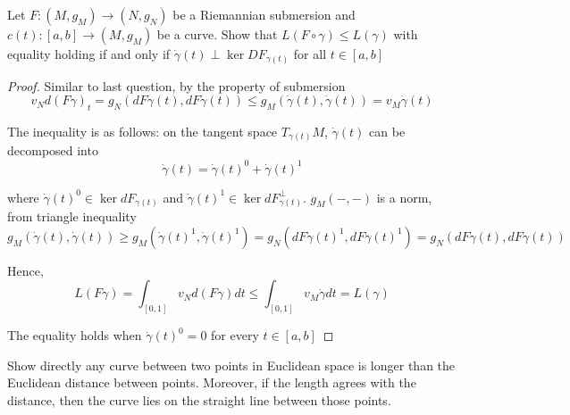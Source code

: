\begin{problem}
	Let $F: (M, g_M) \to (N, g_N)$ be a Riemannian submersion and $c(t): [a, b] \to (M, g_M)$ be a curve. Show that $L(F \circ \gamma) \leq L(\gamma)$ with equality holding if and only if $\dot{\gamma}(t) \perp \ker DF_{\gamma(t)}$ for all $t \in [a, b]$ 
\end{problem}

\begin{proof}
	Similar to last question, by the property of submersion
	$$
		v_N d(F \gamma)_t = g_N(dF \dot{\gamma}(t), dF \dot{\gamma}(t)) \leq g_M(\dot{\gamma}(t), \dot{\gamma}(t)) = v_M \dot{\gamma}(t)
	$$
	
	The inequality is as follows: on the tangent space $T_{\gamma(t)} M$, $\dot{\gamma}(t)$ can be decomposed into
	$$
		\dot{\gamma}(t) = \dot{\gamma}(t)^0 + \dot{\gamma}(t)^1
	$$
	
	where $ \dot{\gamma}(t)^0 \in \ker dF_{\gamma(t)}$ and $\dot{\gamma}(t)^1 \in \ker dF_{\gamma(t)}^\perp$. $g_M(-, -)$ is a norm, from triangle inequality
	$$
		g_M(\dot{\gamma}(t), \dot{\gamma}(t)) \geq g_M(\dot{\gamma}(t)^1, \dot{\gamma}(t)^1) = g_N(dF \dot{\gamma}(t)^1, dF \dot{\gamma}(t)^1) = g_N(dF \dot{\gamma}(t), dF \dot{\gamma}(t))
	$$
	
	Hence,
	$$
		L(F \gamma) = \int_{[0, 1]} v_N d(F \gamma) dt \leq \int_{[0, 1]} v_M \dot{\gamma} dt = L(\gamma)
	$$
	
	The equality holds when $\dot{\gamma}(t)^0 = 0$ for every $t \in [a, b]$
\end{proof}

\begin{problem}
	Show directly any curve between two points in Euclidean space is longer than the Euclidean distance between points. Moreover, if the length agrees with the distance, then the curve lies on the straight line between those points.
\end{problem}

